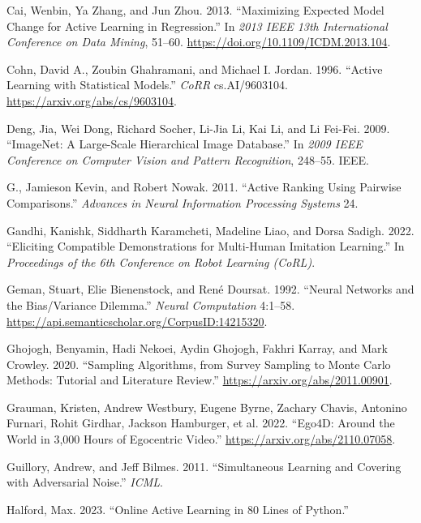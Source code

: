 \documentclass[
  letterpaper,
  numbers=noenddot,
  DIV=11]{scrreprt}
\newlength{\cslhangindent}
\newenvironment{CSLReferences}[2] %
 {\begin{list}{}{%
  \setlength{\itemindent}{0pt}
  \setlength{\leftmargin}{0pt}
  \setlength{\parsep}{0pt}
  \ifodd #1
   \setlength{\leftmargin}{\cslhangindent}
   \setlength{\itemindent}{-1\cslhangindent}
  \fi
  \setlength{\itemsep}{#2\baselineskip}}}
 {\end{list}}
\theoremstyle{definition}
\theoremstyle{plain}
\theoremstyle{plain}
\theoremstyle{remark}
\begin{document}
\begin{CSLReferences}{1}{0}
Cai, Wenbin, Ya Zhang, and Jun Zhou. 2013. {``Maximizing Expected Model
Change for Active Learning in Regression.''} In \emph{2013 IEEE 13th
International Conference on Data Mining}, 51--60.
\url{https://doi.org/10.1109/ICDM.2013.104}.

Cohn, David A., Zoubin Ghahramani, and Michael I. Jordan. 1996.
{``Active Learning with Statistical Models.''} \emph{CoRR}
cs.AI/9603104. \url{https://arxiv.org/abs/cs/9603104}.

Deng, Jia, Wei Dong, Richard Socher, Li-Jia Li, Kai Li, and Li Fei-Fei.
2009. {``ImageNet: A Large-Scale Hierarchical Image Database.''} In
\emph{2009 IEEE Conference on Computer Vision and Pattern Recognition},
248--55. IEEE.

G., Jamieson Kevin, and Robert Nowak. 2011. {``Active Ranking Using
Pairwise Comparisons.''} \emph{Advances in Neural Information Processing
Systems} 24.

Gandhi, Kanishk, Siddharth Karamcheti, Madeline Liao, and Dorsa Sadigh.
2022. {``Eliciting Compatible Demonstrations for Multi-Human Imitation
Learning.''} In \emph{Proceedings of the 6th Conference on Robot
Learning (CoRL)}.

Geman, Stuart, Elie Bienenstock, and René Doursat. 1992. {``Neural
Networks and the Bias/Variance Dilemma.''} \emph{Neural Computation}
4:1--58. \url{https://api.semanticscholar.org/CorpusID:14215320}.

Ghojogh, Benyamin, Hadi Nekoei, Aydin Ghojogh, Fakhri Karray, and Mark
Crowley. 2020. {``Sampling Algorithms, from Survey Sampling to Monte
Carlo Methods: Tutorial and Literature Review.''}
\url{https://arxiv.org/abs/2011.00901}.

Grauman, Kristen, Andrew Westbury, Eugene Byrne, Zachary Chavis,
Antonino Furnari, Rohit Girdhar, Jackson Hamburger, et al. 2022.
{``Ego4D: Around the World in 3,000 Hours of Egocentric Video.''}
\url{https://arxiv.org/abs/2110.07058}.

Guillory, Andrew, and Jeff Bilmes. 2011. {``Simultaneous Learning and
Covering with Adversarial Noise.''} \emph{ICML}.

Halford, Max. 2023. {``Online Active Learning in 80 Lines of Python.''}


\end{CSLReferences}
\end{document}
